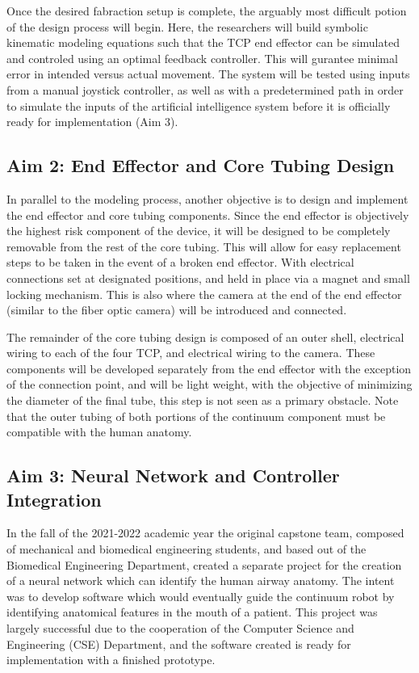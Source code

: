 	Once the desired fabraction setup is complete, the arguably most difficult potion of the design process will begin. Here, the researchers will build symbolic kinematic modeling equations such that the TCP end effector can be simulated and controled using an optimal feedback controller. This will gurantee minimal error in intended versus actual movement. The system will be tested using inputs from a manual joystick controller, as well as with a predetermined path in order to simulate the inputs of the artificial intelligence system before it is officially ready for implementation (Aim 3).
	
	\subsection{Aim 2: End Effector and Core Tubing Design}
	
	In parallel to the modeling process, another objective is to design and implement the end effector and core tubing components. Since the end effector is objectively the highest risk component of the device, it will be designed to be completely removable from the rest of the core tubing. This will allow for easy replacement steps to be taken in the event of a broken end effector. With electrical connections set at designated positions, and held in place via a magnet and small locking mechanism.	 This is also where the camera at the end of the end effector (similar to the fiber optic camera) will be introduced and connected.
	
	The remainder of the core tubing design is composed of an outer shell, electrical wiring to each of the four TCP, and electrical wiring to the camera. These components will be developed separately from the end effector with the exception of the connection point, and will be light weight, with the objective of minimizing the diameter of the final tube, this step is not seen as a primary obstacle. Note that the outer tubing of both portions of the continuum component must be compatible with the human anatomy.
	
	\subsection{Aim 3: Neural Network and Controller Integration}
	
	In the fall of the 2021-2022 academic year the original capstone team, composed of mechanical and biomedical engineering students, and based out of the Biomedical Engineering Department, created a separate project for the creation of a neural network which can identify the human airway anatomy. The intent was to develop software which would eventually guide the continuum robot by identifying anatomical features in the mouth of a patient. This project was largely successful due to the cooperation of the Computer Science and Engineering (CSE) Department, and the software created is ready for implementation with a finished prototype.
	
